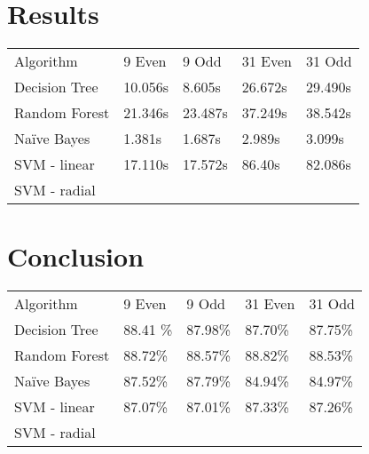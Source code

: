 \documentclass[aps, reprint, amsmath, amssymb]{revtex4-1}
\begin{document}
\section{Results}

\begin{center}
  \begin{tabular}{ | l || l | l | l | l |}
    \hline
    Algorithm & 9 Even & 9 Odd & 31 Even & 31 Odd \\ \hhline{|=||=|=|=|=|}
    Decision Tree & 10.056s & 8.605s & 26.672s & 29.490s \\ \hline
    Random Forest & 21.346s & 23.487s & 37.249s & 38.542s \\ \hline
    Na{\"i}ve Bayes & 1.381s & 1.687s & 2.989s & 3.099s \\ \hline
    SVM - linear & 17.110s & 17.572s & 86.40s & 82.086s \\ \hline
    SVM - radial & & & & \\ 
    \hline
  \end{tabular}
\end{center}
\section{Conclusion}


\begin{center}
  \begin{tabular}{ | l || l | l | l | l |}
    \hline
    Algorithm & 9 Even & 9 Odd & 31 Even & 31 Odd \\ \hhline{|=||=|=|=|=|}

    Decision Tree & 88.41 \% & 87.98\% & 87.70\% & 87.75\% \\ \hline

    Random Forest & 88.72\% & 88.57\% &  88.82\% & 88.53\% \\ \hline

    Na{\"i}ve Bayes & 87.52\% & 87.79\% & 84.94\% & 84.97\% \\ \hline

    SVM - linear & 87.07\% & 87.01\% & 87.33\% & 87.26\% \\ \hline

    SVM - radial &  & & & \\ 
    \hline
  \end{tabular}
\end{center}
\end{document}
